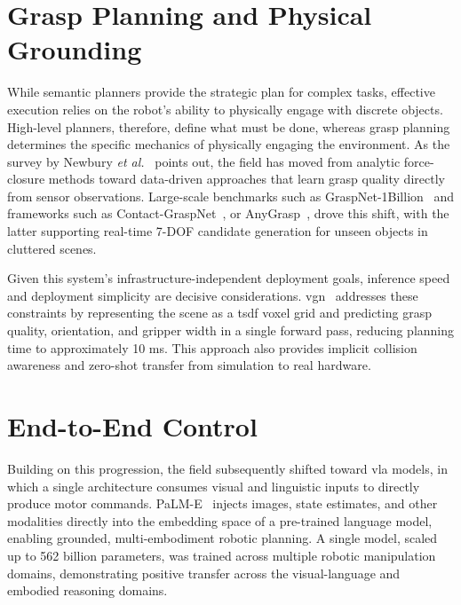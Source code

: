 \documentclass[
     12pt,
     a4paper,
     BCOR=10mm,
     DIV=14,
     listof=totoc,
     bibliography=totoc,
     parskip,
     twoside,
     headsepline
     ]{scrreprt}
\begin{document}
\section{Grasp Planning and Physical Grounding}
While semantic planners provide the strategic plan for complex tasks, effective execution relies on the robot's ability to physically engage with discrete objects. High-level planners, therefore, define what must be done, whereas grasp planning determines the specific mechanics of physically engaging the environment. As the survey by Newbury \emph{et al.}~\cite{newbury2023deeplearningapproachesgrasp} points out, the field has moved from analytic force-closure methods toward data-driven approaches that learn grasp quality directly from sensor observations. Large-scale benchmarks such as GraspNet-1Billion~\cite{graspnet} and frameworks such as Contact-GraspNet~\cite{sundermeyer2021contactgraspnetefficient6dofgrasp}, or AnyGrasp~\cite{fang2023anygrasprobustefficientgrasp}, drove this shift, with the latter supporting real-time 7-DOF candidate generation for unseen objects in cluttered scenes.

Given this system's infrastructure-independent deployment goals, inference speed and deployment simplicity are decisive considerations. \gls{vgn}~\cite{breyer2021volumetricgraspingnetworkrealtime} addresses these constraints by representing the scene as a \gls{tsdf} voxel grid and predicting grasp quality, orientation, and gripper width in a single forward pass, reducing planning time to approximately 10 ms. This approach also provides implicit collision awareness and zero-shot transfer from simulation to real hardware.

\section{End-to-End Control}
Building on this progression, the field subsequently shifted toward \gls{vla} models, in which a single architecture consumes visual and linguistic inputs to directly produce motor commands. PaLM-E~\cite{driess2023palmeembodiedmultimodallanguage} injects images, state estimates, and other modalities directly into the embedding space of a pre-trained language model, enabling grounded, multi-embodiment robotic planning. A single model, scaled up to 562 billion parameters, was trained across multiple robotic manipulation domains, demonstrating positive transfer across the visual-language and embodied reasoning domains.
\end{document}
